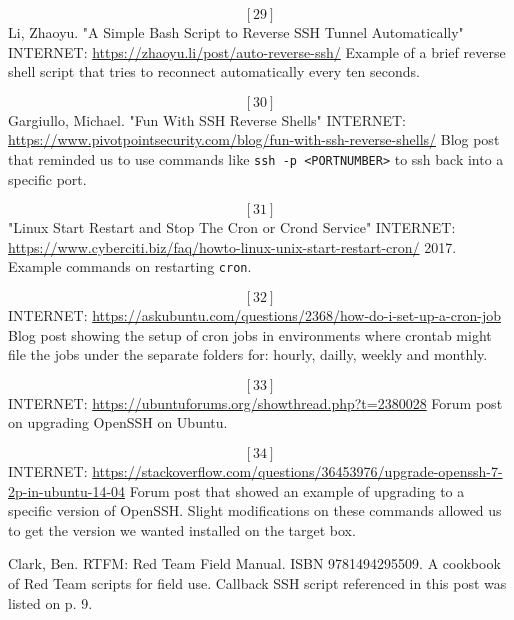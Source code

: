 \[[29]\]  Li, Zhaoyu.  "A Simple Bash Script to Reverse SSH Tunnel Automatically"  INTERNET: \url{https://zhaoyu.li/post/auto-reverse-ssh/}
Example of a brief reverse shell script that tries to reconnect automatically every ten seconds.

\[[30]\]  Gargiullo, Michael.  "Fun With SSH Reverse Shells"  INTERNET: \url{https://www.pivotpointsecurity.com/blog/fun-with-ssh-reverse-shells/}
Blog post that reminded us to use commands like \texttt{ssh -p <PORTNUMBER>} to ssh back into a specific port.

\[[31]\]  "Linux Start Restart and Stop The Cron or Crond Service"  INTERNET: \url{https://www.cyberciti.biz/faq/howto-linux-unix-start-restart-cron/} 2017.
Example commands on restarting \texttt{cron}.

\[[32]\]  INTERNET: \url{https://askubuntu.com/questions/2368/how-do-i-set-up-a-cron-job}
Blog post showing the setup of cron jobs in environments where crontab might file the jobs under the separate folders for: hourly, dailly, weekly and monthly.

\[[33]\]  INTERNET: \url{https://ubuntuforums.org/showthread.php?t=2380028}
Forum post on upgrading OpenSSH on Ubuntu.

\[[34]\]  INTERNET: \url{https://stackoverflow.com/questions/36453976/upgrade-openssh-7-2p-in-ubuntu-14-04}
Forum post that showed an example of upgrading to a specific version of OpenSSH.  Slight modifications on these commands allowed us to get the version we wanted installed on the target box.

\endnote{[35]}  Clark, Ben. RTFM:  Red Team Field Manual.  ISBN 9781494295509.
A cookbook of Red Team scripts for field use.  Callback SSH script referenced in this post was listed on p. 9.

